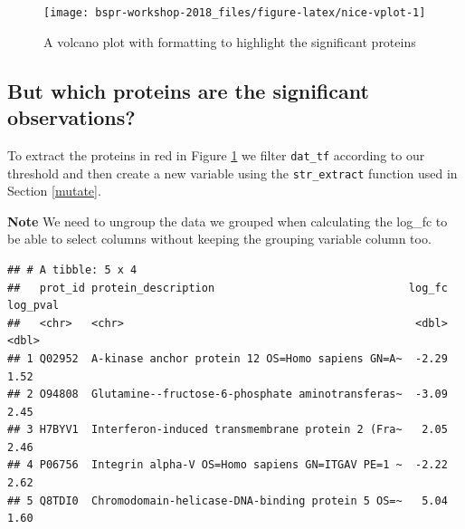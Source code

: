 \documentclass[12pt,]{book}
\newenvironment{Shaded}{\begin{snugshade}}{\end{snugshade}}
\newcommand{\KeywordTok}[1]{\textcolor[rgb]{0.13,0.29,0.53}{\textbf{#1}}}
\newcommand{\DataTypeTok}[1]{\textcolor[rgb]{0.13,0.29,0.53}{#1}}
\newcommand{\DecValTok}[1]{\textcolor[rgb]{0.00,0.00,0.81}{#1}}
\newcommand{\FloatTok}[1]{\textcolor[rgb]{0.00,0.00,0.81}{#1}}
\newcommand{\StringTok}[1]{\textcolor[rgb]{0.31,0.60,0.02}{#1}}
\newcommand{\CommentTok}[1]{\textcolor[rgb]{0.56,0.35,0.01}{\textit{#1}}}
\newcommand{\OperatorTok}[1]{\textcolor[rgb]{0.81,0.36,0.00}{\textbf{#1}}}
\newcommand{\NormalTok}[1]{#1}
\theoremstyle{definition}
\theoremstyle{definition}
\theoremstyle{definition}
\theoremstyle{remark}
\begin{document}
\begin{figure}

{\centering \texttt{[image: bspr-workshop-2018\_files/figure-latex/nice-vplot-1]} 

}

\caption{A volcano plot with formatting to highlight the significant
proteins}\label{fig:nice-vplot}
\end{figure}

\subsection{But which proteins are the significant
observations?}\label{but-which-proteins-are-the-significant-observations}

To extract the proteins in red in Figure \ref{fig:nice-vplot} we filter
\texttt{dat\_tf} according to our threshold and then create a new
variable using the \texttt{str\_extract} function used in Section
\ref{mutate}.

\textbf{Note} We need to ungroup the data we grouped when calculating
the log\_fc to be able to select columns without keeping the grouping
variable column too.

\begin{Shaded}
\end{Shaded}

\begin{verbatim}
## # A tibble: 5 x 4
##   prot_id protein_description                              log_fc log_pval
##   <chr>   <chr>                                             <dbl>    <dbl>
## 1 Q02952  A-kinase anchor protein 12 OS=Homo sapiens GN=A~  -2.29     1.52
## 2 O94808  Glutamine--fructose-6-phosphate aminotransferas~  -3.09     2.45
## 3 H7BYV1  Interferon-induced transmembrane protein 2 (Fra~   2.05     2.46
## 4 P06756  Integrin alpha-V OS=Homo sapiens GN=ITGAV PE=1 ~  -2.22     2.62
## 5 Q8TDI0  Chromodomain-helicase-DNA-binding protein 5 OS=~   5.04     1.60
\end{verbatim}
\end{document}
